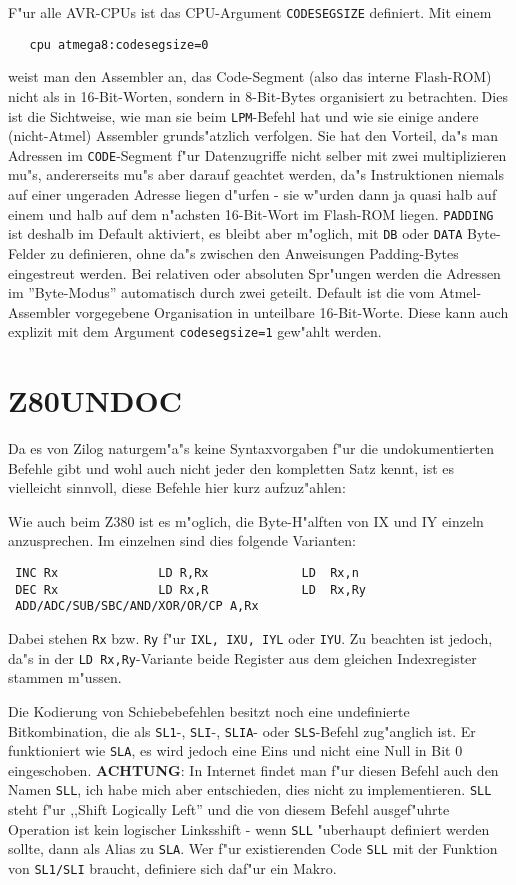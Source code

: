 \documentclass[12pt,a4paper,twoside]{report}
\newcommand{\bb}[1]{{\bf #1}}
\newcommand{\tty}[1]{{\tt #1}}
\begin{document}
F"ur alle AVR-CPUs ist das CPU-Argument {\tt CODESEGSIZE} definiert.
Mit einem
\begin{verbatim}
   cpu atmega8:codesegsize=0
\end{verbatim}
weist man den Assembler an, das Code-Segment (also das interne Flash-ROM)
nicht als in 16-Bit-Worten, sondern in 8-Bit-Bytes organisiert zu betrachten.
Dies ist die Sichtweise, wie man sie beim {\tt LPM}-Befehl hat und wie sie
einige andere (nicht-Atmel) Assembler grunds"atzlich verfolgen.  Sie hat den
Vorteil, da"s man Adressen im {\tt CODE}-Segment f"ur Datenzugriffe nicht selber
mit zwei multiplizieren mu"s, andererseits mu"s aber darauf geachtet werden,
da"s Instruktionen niemals auf einer ungeraden Adresse liegen d"urfen - sie
w"urden dann ja quasi halb auf einem und halb auf dem n"achsten 16-Bit-Wort
im Flash-ROM liegen.  {\tt PADDING} ist deshalb im Default aktiviert, es bleibt
aber m"oglich, mit {\tt DB} oder {\tt DATA} Byte-Felder zu definieren, ohne
da"s zwischen den Anweisungen Padding-Bytes eingestreut werden.  Bei relativen
oder absoluten Spr"ungen werden die Adressen im ''Byte-Modus'' automatisch
durch zwei geteilt.  Default ist die vom Atmel-Assembler vorgegebene Organisation
in unteilbare 16-Bit-Worte.  Diese kann auch explizit mit dem Argument
\verb!codesegsize=1! gew"ahlt werden.


\section{Z80UNDOC}

Da es von Zilog naturgem"a"s keine Syntaxvorgaben f"ur die undokumentierten
Befehle gibt und wohl auch nicht jeder den kompletten Satz kennt,
ist es vielleicht sinnvoll, diese Befehle hier kurz aufzuz"ahlen:
\par
Wie auch beim Z380 ist es m"oglich, die Byte-H"alften von IX und IY
einzeln anzusprechen.  Im einzelnen sind dies folgende Varianten:
\begin{verbatim}
 INC Rx              LD R,Rx             LD  Rx,n
 DEC Rx              LD Rx,R             LD  Rx,Ry
 ADD/ADC/SUB/SBC/AND/XOR/OR/CP A,Rx
\end{verbatim}
Dabei stehen \tty{Rx} bzw. \tty{Ry} f"ur \tty{IXL, IXU, IYL} oder
\tty{IYU}.  Zu beachten ist jedoch, da"s in der \tty{LD Rx,Ry}-Variante
beide Register aus dem gleichen Indexregister stammen m"ussen.
\par
Die Kodierung von Schiebebefehlen besitzt noch eine undefinierte
Bitkombination, die als \tty{SL1}-, \tty{SLI}-, \tty{SLIA}- oder
\tty{SLS}-Befehl zug"anglich ist.  Er funktioniert wie \tty{SLA},
es wird jedoch eine Eins und nicht eine Null in Bit 0 eingeschoben.
\bb{ACHTUNG}: In Internet findet man f"ur diesen Befehl auch den
Namen \tty{SLL}, ich habe mich aber entschieden, dies nicht zu
implementieren.  \tty{SLL} steht f"ur ,,Shift Logically Left'' und
die von diesem Befehl ausgef"uhrte Operation ist kein logischer
Linksshift - wenn \tty{SLL} "uberhaupt definiert werden sollte, dann
als Alias zu \tty{SLA}.  Wer f"ur existierenden Code \tty{SLL} mit
der Funktion von \tty{SL1/SLI} braucht, definiere sich daf"ur ein
Makro.
\end{document}

